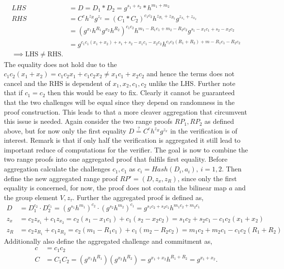 \begin{align*}
LHS &= D = D_1*D_2 = g^{s_1+s_2}*h^{m_1+m_2} \\
RHS &= C^ch^{z_R}g^{z_x} = (C_1*C_2)^{c_1c_2}h^{z_{R_1}+z_{R_2}}g^{z_{x_1}+z_{x_2}} \\ 
&=(g^{x_1}h^{R_1}g^{x_2}h^{R_2}) ^{c_1c_2}  h^{m_1-R_1c_1+m_2-R_2c_2} g^{s_1- x_1c_1+s_2-x_2c_2} \\
&= g^{c_1c_1(x_1+x_2)+s_1+s_2-x_1c_1-x_2c_2}h^{c_1c_2(R_1+R_2)+m-R_1c_1-R_2c_2} \\
\implies \text{LHS}\neq \text{RHS}.
\end{align*}
The equality does not hold due to the $ c_1c_2(x_1+x_2) = c_1c_2x_1+c_1c_2x_2 \neq x_1c_1 + x_2c_2$ and hence the terms does not cancel and the RHS is dependent of $x_1,x_2,c_1,c_2$ unlike the LHS. Further note that if $c_1=c_2$ then this would be easy to fix. Clearly it cannot be guaranteed that the two challenges will be equal since they depend on randomness in the proof construction. This leads to that a more cleaver aggregation that circumvent this issue is needed. Again consider the two range proofs $RP_1,RP_2$ as defined above, but for now only the first equality $D\overset{?}{=} C^ch^{z_R}g^{z_x}$ in the verification is of interest. Remark is that if only half the verification is aggregated it still lead to important reduce of computations for the verifier. The goal is now to combine the two range proofs into one aggregated proof  that fulfils first equality. Before aggregation calculate the challenges $c_1,c_1$ as $c_i =Hash(D_i,a_i),\:i=1,2$. Then define the new aggregated range proof  $RP' =(D,z_x,z_R)$, since only the first equality is concerned, for now, the proof does not contain the bilinear map $a$ and the group element $V, z_{\tau}$. Further the aggregated proof is defined as, 
\begin{equation}
\label{eq:aggD2}
\begin{aligned}
D &= D_1^{c_2}\cdot D_2^{c_1} = (g^{s_1}h^{m_1}) ^{c_2} \cdot (g^{s_2}h^{m_2}) ^{c_1}  =g^{s_1c_2+s_2c_1}h^{m_1c_2+m_2c_1} \\
z_x &= c_2z_{x_1} +c_1 z_{x_2} = c_2(s_1-x_1c_1)  + c_1(s_2-x_2c_2) = s_1c_2 + s_2c_1 -c_1c_2(x_1+x_2)\\
z_R &= c_2z_{R_1} +c_1 z_{R_2} = c_2(m_1-R_1c_1)  + c_1(m_2-R_2c_2) = m_1c_2 + m_2c_1 -c_1c_2(R_1+R_2)
\end{aligned}
\end{equation}
Additionally also define the aggregated challenge and commitment as,
\begin{align*}
c &= c_1c_2 \\
C &= C_1C_2 = (g^{x_1}h^{R_1}) (g^{x_2}h^{R_2}) = g^{x_1+x_2}h^{R_1+R_2}= g^{x_1+x_2}.
\end{align*}
